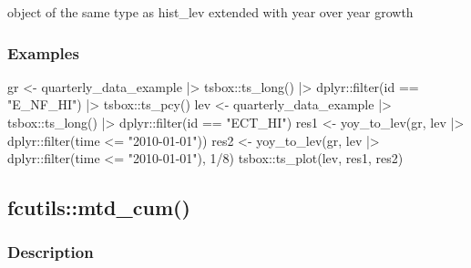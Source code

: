 \documentclass[
  letterpaper,
  DIV=11,
  numbers=noendperiod]{scrreport}
\newenvironment{Shaded}{\begin{snugshade}}{\end{snugshade}}
\newcommand{\DecValTok}[1]{\textcolor[rgb]{0.68,0.00,0.00}{#1}}
\newcommand{\FunctionTok}[1]{\textcolor[rgb]{0.28,0.35,0.67}{#1}}
\newcommand{\NormalTok}[1]{\textcolor[rgb]{0.00,0.23,0.31}{#1}}
\newcommand{\OtherTok}[1]{\textcolor[rgb]{0.00,0.23,0.31}{#1}}
\newcommand{\SpecialCharTok}[1]{\textcolor[rgb]{0.37,0.37,0.37}{#1}}
\newcommand{\StringTok}[1]{\textcolor[rgb]{0.13,0.47,0.30}{#1}}
\begin{document}
object of the same type as hist\_lev extended with year over year growth

\subsubsection{Examples}\label{examples-38}

\begin{Shaded}
\begin{Highlighting}[]
\NormalTok{gr }\OtherTok{\textless{}{-}}\NormalTok{ quarterly\_data\_example }\SpecialCharTok{|\textgreater{}}
\NormalTok{  tsbox}\SpecialCharTok{::}\FunctionTok{ts\_long}\NormalTok{() }\SpecialCharTok{|\textgreater{}}
\NormalTok{  dplyr}\SpecialCharTok{::}\FunctionTok{filter}\NormalTok{(id }\SpecialCharTok{==} \StringTok{"E\_NF\_HI"}\NormalTok{) }\SpecialCharTok{|\textgreater{}}
\NormalTok{  tsbox}\SpecialCharTok{::}\FunctionTok{ts\_pcy}\NormalTok{()}
\NormalTok{lev }\OtherTok{\textless{}{-}}\NormalTok{ quarterly\_data\_example }\SpecialCharTok{|\textgreater{}}
\NormalTok{  tsbox}\SpecialCharTok{::}\FunctionTok{ts\_long}\NormalTok{() }\SpecialCharTok{|\textgreater{}}
\NormalTok{  dplyr}\SpecialCharTok{::}\FunctionTok{filter}\NormalTok{(id }\SpecialCharTok{==} \StringTok{"ECT\_HI"}\NormalTok{)}
\NormalTok{res1 }\OtherTok{\textless{}{-}} \FunctionTok{yoy\_to\_lev}\NormalTok{(gr, lev }\SpecialCharTok{|\textgreater{}}\NormalTok{ dplyr}\SpecialCharTok{::}\FunctionTok{filter}\NormalTok{(time }\SpecialCharTok{\textless{}=} \StringTok{"2010{-}01{-}01"}\NormalTok{))}
\NormalTok{res2 }\OtherTok{\textless{}{-}} \FunctionTok{yoy\_to\_lev}\NormalTok{(gr, lev }\SpecialCharTok{|\textgreater{}}\NormalTok{ dplyr}\SpecialCharTok{::}\FunctionTok{filter}\NormalTok{(time }\SpecialCharTok{\textless{}=} \StringTok{"2010{-}01{-}01"}\NormalTok{), }\DecValTok{1}\SpecialCharTok{/}\DecValTok{8}\NormalTok{)}
\NormalTok{tsbox}\SpecialCharTok{::}\FunctionTok{ts\_plot}\NormalTok{(lev, res1, res2)}
\end{Highlighting}
\end{Shaded}

\subsection{fcutils::mtd\_cum()}\label{fcutilsmtd_cum}

\subsubsection{Description}\label{description-39}
\end{document}
